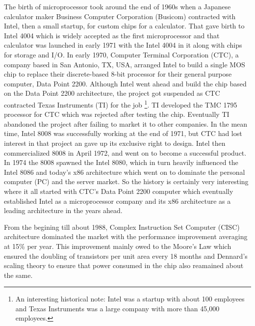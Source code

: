 \documentclass[journal]{IEEEtran}
\begin{document}
The birth of microprocessor took around the end of 1960s when a Japanese calculator maker Business Computer Corporation (Busicom) contracted with Intel, then a small startup, for custom chips for a calculator. That gave birth to Intel 4004 which is widely accepted as the first microprocessor and that calculator was launched in early 1971 with the Intel 4004 in it along with chips for storage and I/O. In early 1970, Computer Terminal Corporation (CTC), a company based in San Antonio, TX, USA, arranged Intel to build a single MOS chip to replace their discrete-based 8-bit processor for their general purpose computer, Data Point 2200. Although Intel went ahead and build the chip based on the Data Point 2200 architecture, the project got suspended as CTC contracted Texas Instruments (TI) for the job \footnote{An interesting historical note: Intel was a startup with about 100 employees and Texas Instruments was a large company with more than 45,000 employees.}. TI developed the TMC 1795 processor for CTC which was rejected after testing the chip. Eventually TI abandoned the project after failing to market it to other companies. In the mean time, Intel 8008 was successfully working at the end of 1971, but CTC had lost interest in that project an gave up its exclusive right to design. Intel then commercialized 8008 in April 1972, and went on to become a successful product. In 1974 the 8008 spawned the Intel 8080, which in turn heavily influenced the Intel 8086 and today's x86 architecture which went on to dominate the personal computer (PC) and the server market. So the history is certainly very interesting where it all started with CTC's Data Point 2200 computer which eventually established Intel as a microprocessor company and its x86 architecture as a leading architecture in the years ahead.

From the begining till about 1988, Complex Instruction Set Computer (CISC) architecture dominated the market with the performance improvement averaging at 15\% per year. This improvement mainly owed to the Moore's Law which ensured the doubling of transistors per unit area every 18 months and Dennard's scaling theory to ensure that power consumed in the chip also reamained about the same.

\ifCLASSOPTIONcaptionsoff
  \newpage
\fi



\end{document}
